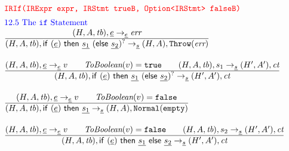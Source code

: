 \[\begin{array}{l@{~~}l@{~~}ll}
\mtt{\normalsize\inred IRIf(IRExpr expr, IRStmt trueB, Option<IRStmt> falseB)}\\[.5em]

\mbox{\inblue 12.5 The {\tt if} Statement}\\
\frac{\begin{matrix}
\evale, \irexpr \rightarrow_{\ir\expr} \err
\end{matrix}}{\begin{matrix}
\state, \irif \rightarrow_{\ir\stmt} \res, \error
\end{matrix}}
\\[2em]

\frac{\begin{matrix}
\evale, \irexpr \rightarrow_{\ir\expr} v
\rulesep
\hf{ToBoolean}(v) = \true
\rulesep
\statel, \stmt_1 \rightarrow_{\ir\stmt} \resp, \ct
\end{matrix}}{\begin{matrix}
\state, \irif \rightarrow_{\ir\stmt} \resp, \ct
\end{matrix}}
\\[2em]

\frac{\begin{matrix}
\evale, \irexpr \rightarrow_{\ir\expr} v
\rulesep
\hf{ToBoolean}(v) = \false
\end{matrix}}{\begin{matrix}
\state, {\sf if} \ {\tt(}\irexpr{\tt)}\ {\sf then} \ \ir{\stmt_1} 
\rightarrow_{\ir\stmt} \res, \void
\end{matrix}}
\\[2em]

\frac{\begin{matrix}
\evale, \irexpr \rightarrow_{\ir\expr} v
\rulesep
\hf{ToBoolean}(v) = \false
\rulesep
\statel, \stmt_2\rightarrow_{\ir\stmt} \resp, \ct
\end{matrix}}{\begin{matrix}
\state, {\sf if} \ {\tt(}\irexpr{\tt)}\ {\sf then} \ \ir{\stmt_1} \ {\sf else} \ \ir{\stmt_2}
\rightarrow_{\ir\stmt} \resp, \ct
\end{matrix}}
\\[4em]



\end{array}
\]





